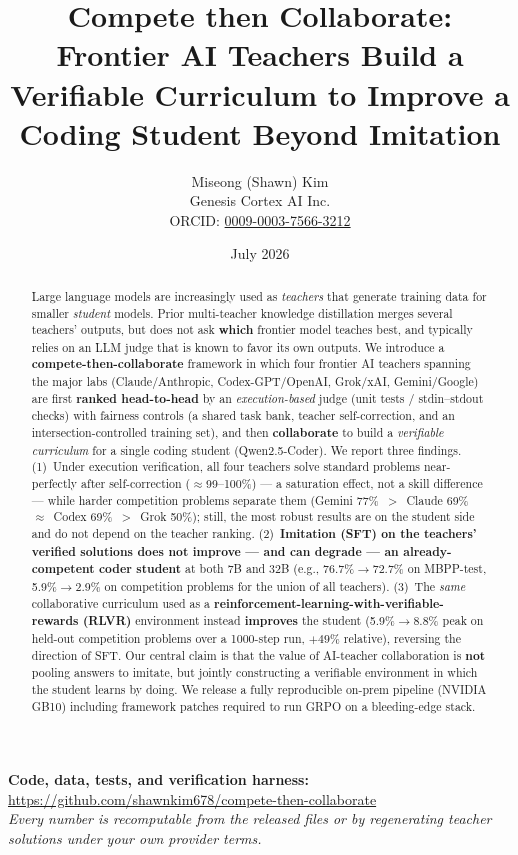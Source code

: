 \documentclass[11pt]{article}
\title{Compete then Collaborate: Frontier AI Teachers Build a\\
Verifiable Curriculum to Improve a Coding Student Beyond Imitation}
\author{Miseong (Shawn) Kim \\ \small Genesis Cortex AI Inc. \\ \small ORCID: \href{https://orcid.org/0009-0003-7566-3212}{0009-0003-7566-3212}}
\date{July 2026}
\begin{document}
\maketitle

\begin{center}
\small\textbf{Code, data, tests, and verification harness:}
\url{https://github.com/shawnkim678/compete-then-collaborate}\\[-2pt]
\small\emph{Every number is recomputable from the released files or by regenerating teacher solutions under your own provider terms.}
\end{center}

\begin{abstract}
Large language models are increasingly used as \emph{teachers} that generate training
data for smaller \emph{student} models. Prior multi-teacher knowledge distillation merges
several teachers' outputs, but does not ask \textbf{which} frontier model teaches best, and
typically relies on an LLM judge that is known to favor its own outputs. We introduce a
\textbf{compete-then-collaborate} framework in which four frontier AI teachers spanning the major
labs (Claude/Anthropic, Codex-GPT/OpenAI, Grok/xAI, Gemini/Google) are first
\textbf{ranked head-to-head} by an
\emph{execution-based} judge (unit tests / stdin--stdout checks) with fairness controls
(a shared task bank, teacher self-correction, and an intersection-controlled training set),
and then \textbf{collaborate} to build a \emph{verifiable curriculum} for a single coding
student (Qwen2.5-Coder). We report three findings. (1)~Under execution verification, all four
teachers solve standard problems near-perfectly after self-correction ($\approx$99--100\%)
--- a saturation effect, not a skill difference --- while harder competition problems separate
them (Gemini 77\%~$>$~Claude 69\%~$\approx$~Codex 69\%~$>$~Grok 50\%); still, the most robust
results are on the student side and do not depend on the teacher ranking. (2)~\textbf{Imitation
(SFT) on the teachers' verified solutions does not improve --- and can degrade --- an
already-competent coder student} at both 7B and 32B (e.g., 76.7\%$\rightarrow$72.7\% on
MBPP-test, 5.9\%$\rightarrow$2.9\% on competition problems for the union of all teachers).
(3)~The \emph{same} collaborative curriculum used as a \textbf{reinforcement-learning-with-verifiable-rewards
(RLVR)} environment instead \textbf{improves} the student (5.9\%$\rightarrow$8.8\% peak on held-out
competition problems over a 1000-step run, $+49\%$ relative), reversing the direction of SFT. Our central claim is that the value of
AI-teacher collaboration is \textbf{not} pooling answers to imitate, but jointly constructing a
verifiable environment in which the student learns by doing. We release a fully reproducible
on-prem pipeline (NVIDIA GB10) including framework patches required to run GRPO on a
bleeding-edge stack.
\end{abstract}
\end{document}
